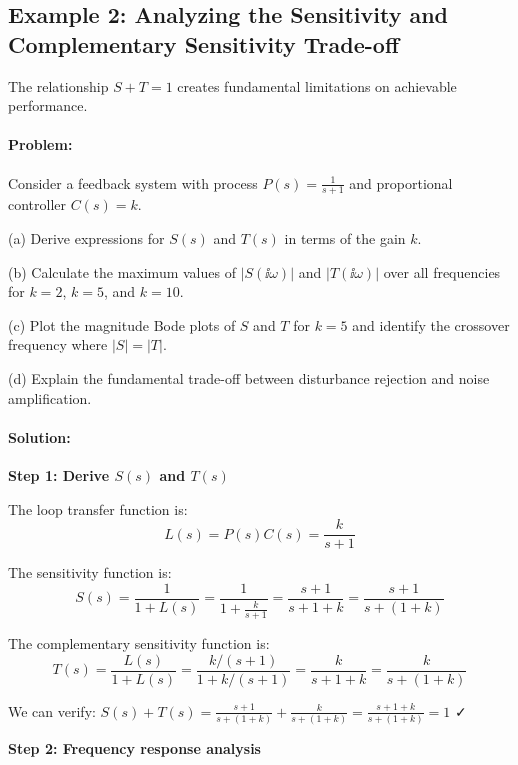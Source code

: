 \documentclass[11pt,a4paper]{article}
\begin{document}
\subsection{Example 2: Analyzing the Sensitivity and Complementary Sensitivity Trade-off}

The relationship $S + T = 1$ creates fundamental limitations on achievable performance.

\paragraph{Problem:}
Consider a feedback system with process $P(s) = \frac{1}{s+1}$ and proportional controller $C(s) = k$.

(a) Derive expressions for $S(s)$ and $T(s)$ in terms of the gain $k$.

(b) Calculate the maximum values of $|S(\ii\omega)|$ and $|T(\ii\omega)|$ over all frequencies for $k = 2$, $k = 5$, and $k = 10$.

(c) Plot the magnitude Bode plots of $S$ and $T$ for $k = 5$ and identify the crossover frequency where $|S| = |T|$.

(d) Explain the fundamental trade-off between disturbance rejection and noise amplification.

\paragraph{Solution:}

\textbf{Step 1: Derive $S(s)$ and $T(s)$}

The loop transfer function is:
\begin{equation}
  L(s) = P(s)C(s) = \frac{k}{s+1}
\end{equation}

The sensitivity function is:
\begin{equation}
  S(s) = \frac{1}{1 + L(s)} = \frac{1}{1 + \frac{k}{s+1}} = \frac{s+1}{s+1+k} = \frac{s+1}{s+(1+k)}
\end{equation}

The complementary sensitivity function is:
\begin{equation}
  T(s) = \frac{L(s)}{1 + L(s)} = \frac{k/(s+1)}{1 + k/(s+1)} = \frac{k}{s+1+k} = \frac{k}{s+(1+k)}
\end{equation}

We can verify: $S(s) + T(s) = \frac{s+1}{s+(1+k)} + \frac{k}{s+(1+k)} = \frac{s+1+k}{s+(1+k)} = 1$ ✓

\textbf{Step 2: Frequency response analysis}
\end{document}
